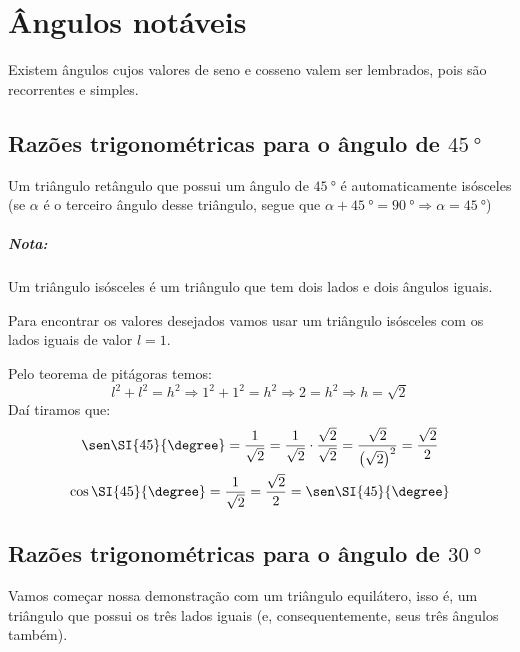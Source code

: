 \chapter{Ângulos notáveis}

Existem ângulos cujos valores de seno e cosseno valem ser lembrados, pois são recorrentes e simples.

\section{Razões trigonométricas para o ângulo de \texorpdfstring{$\SI{45}{\degree}$}{45º}}

Um triângulo retângulo que possui um ângulo de $\SI{45}{\degree}$ é automaticamente isósceles (se $\alpha$ é o terceiro ângulo desse triângulo, segue que $\alpha + \SI{45}{\degree}=\SI{90}{\degree}\Rightarrow\alpha=\SI{45}{\degree}$)

\paragraph{Nota:}
Um triângulo isósceles é um triângulo que tem dois lados e dois ângulos iguais.

Para encontrar os valores desejados vamos usar um triângulo isósceles com os lados iguais de valor $l=1$.

\begin{multicols}{2}
	Pelo teorema de pitágoras temos:
	$$
		l^2+l^2=h^2\Rightarrow1^2+1^2=h^2\Rightarrow2=h^2\Rightarrow h=\sqrt{2}
	$$
	Daí tiramos que:
	\begin{gather*}
		\sen\SI{45}{\degree}=\frac{1}{\sqrt{2}}=\frac{1}{\sqrt{2}}\cdot\frac{\sqrt{2}}{\sqrt{2}}=\frac{\sqrt{2}}{\left(\sqrt{2}\right)^2}=\frac{\sqrt{2}}{2}\\
		\cos\SI{45}{\degree}=\frac{1}{\sqrt{2}}=\frac{\sqrt{2}}{2}=\sen\SI{45}{\degree}
	\end{gather*}

	

\end{multicols}

\section{Razões trigonométricas para o ângulo de \texorpdfstring{$\SI{30}{\degree}$}{30º}}

Vamos começar nossa demonstração com um triângulo equilátero, isso é, um triângulo que possui os três lados iguais (e, consequentemente, seus três ângulos também).

